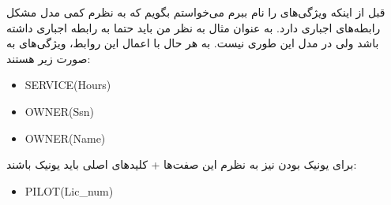 \noindent
قبل از اینکه ویژگی‌های
را نام ببرم می‌خواستم بگویم که به نظرم کمی مدل
مشکل رابطه‌های اجباری دارد. به عنوان مثال به نظر من باید حتما
به
رابطه اجباری داشته باشد ولی در مدل
این طوری نیست. به هر حال با اعمال این روابط، ویژگی‌های
به صورت زیر هستند:
\begin{latin}
\begin{itemize}
    \item SERVICE(Hours)
    \item OWNER(Ssn)
    \item OWNER(Name)
\end{itemize}
\end{latin}
برای یونیک بودن نیز به نظرم این صفت‌ها + کلید‌های اصلی باید یونیک باشند:
\begin{latin}
\begin{itemize}
    \item PILOT(Lic\_num)
\end{itemize}
\end{latin}


